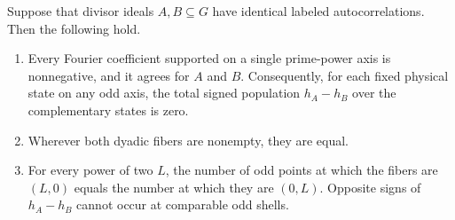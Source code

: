 \begin{lemma}
\label{lem:common-dyadic-fibers}
Suppose that divisor ideals \(A,B\subseteq G\) have identical labeled
autocorrelations. Then the following hold.
\begin{enumerate}
\item Every Fourier coefficient supported on a single prime-power axis
is nonnegative, and it agrees for \(A\) and \(B\).
Consequently, for each fixed physical state on any odd axis, the total
signed population \(h_A-h_B\) over the complementary states is zero.
\item Wherever both dyadic fibers are nonempty, they are equal.
\item For every power of two \(L\), the number of odd points at which
the fibers are \((L,0)\) equals the number at which they are \((0,L)\).
Opposite signs of \(h_A-h_B\) cannot occur at comparable odd shells.
\end{enumerate}
\end{lemma}

